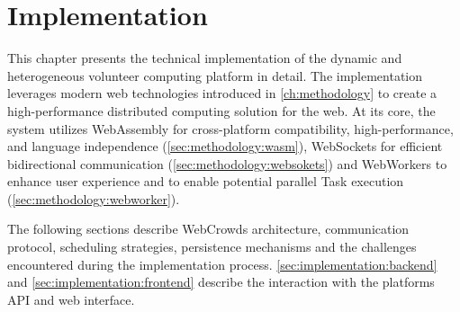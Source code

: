 \chapter{Implementation}
\label{ch:implementation}
This chapter presents the technical implementation of the dynamic and heterogeneous volunteer computing platform in detail. The implementation leverages modern web technologies introduced in \autoref{ch:methodology} to create a high-performance distributed computing solution for the web. At its core, the system utilizes WebAssembly for cross-platform compatibility, high-performance, and language independence (\autoref{sec:methodology:wasm}), WebSockets for efficient bidirectional communication (\autoref{sec:methodology:websokets}) and WebWorkers to enhance user experience and to enable potential parallel Task execution (\autoref{sec:methodology:webworker}).

The following sections describe WebCrowds architecture, communication protocol, scheduling strategies, persistence mechanisms and the challenges encountered during the implementation process. \autoref{sec:implementation:backend} and \autoref{sec:implementation:frontend} describe the interaction with the platforms API and web interface.

